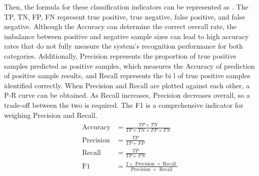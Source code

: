 Then, the formula for these classification indicators can be represented as \eqname{\ref{fml:ch3-conmat}}. The TP, TN, FP, FN represent true positive, true negative, false positive, and false negative. Although the Accuracy can determine the correct overall rate, the imbalance between positive and negative sample sizes can lead to high accuracy rates that do not fully measure the system's recognition performance for both categories. Additionally, Precision represents the proportion of true positive samples predicted as positive samples, which measures the Accuracy of prediction of positive sample results, and Recall represents the bi l of true positive samples identified correctly. When Precision and Recall are plotted against each other, a P-R curve can be obtained. As Recall increases, Precision decreases overall, so a trade-off between the two is required. The F1 is a comprehensive indicator for weighing Precision and Recall.
\begin{align}\label{fml:ch3-conmat}
    \begin{split}
        \operatorname{Accuracy} &= \frac{TP+TN}{TP+TN+FP+FN} \\
        \operatorname{Precision} &= \frac{TP}{TP+FP} \\
        \operatorname{Recall} &= \frac{TP}{TP+FN} \\
        \operatorname{F1} &= \frac{2\times \operatorname{Precision}\times\operatorname{Recall}}{\operatorname{Precision}+\operatorname{Recall}}
    \end{split}
\end{align}
